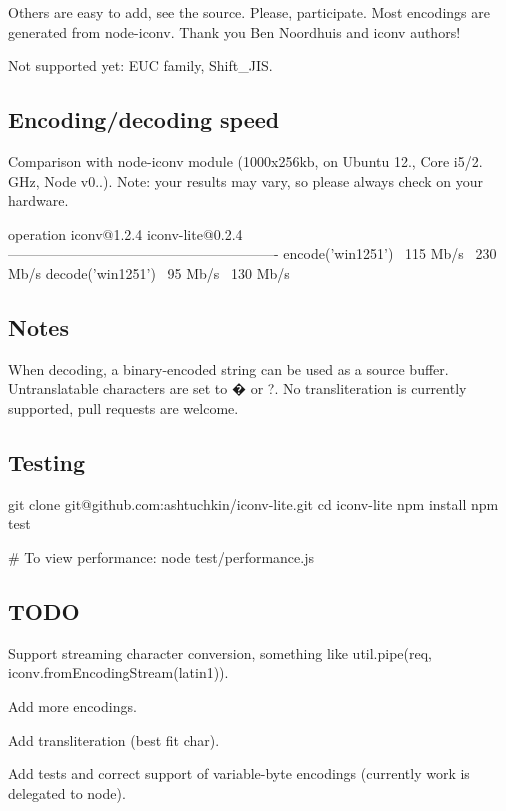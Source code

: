Others are easy to add, see the source. Please, participate. Most encodings are generated from node-\/iconv. Thank you Ben Noordhuis and iconv authors!

Not supported yet\+: E\+UC family, Shift\+\_\+\+J\+IS.

\subsection*{Encoding/decoding speed}

Comparison with node-\/iconv module (1000x256kb, on Ubuntu 12., Core i5/2. G\+Hz, Node v0..). Note\+: your results may vary, so please always check on your hardware. \begin{DoxyVerb}operation             iconv@1.2.4   iconv-lite@0.2.4 
----------------------------------------------------------
encode('win1251')     ~115 Mb/s     ~230 Mb/s
decode('win1251')     ~95 Mb/s      ~130 Mb/s
\end{DoxyVerb}


\subsection*{Notes}

When decoding, a \textquotesingle{}binary\textquotesingle{}-\/encoded string can be used as a source buffer. Untranslatable characters are set to � or ?. No transliteration is currently supported, pull requests are welcome.

\subsection*{Testing}

\begin{DoxyVerb}git clone git@github.com:ashtuchkin/iconv-lite.git
cd iconv-lite
npm install
npm test

# To view performance:
node test/performance.js
\end{DoxyVerb}


\subsection*{T\+O\+DO}


\begin{DoxyItemize}
\item Support streaming character conversion, something like util.\+pipe(req, iconv.\+from\+Encoding\+Stream(\textquotesingle{}latin1\textquotesingle{})).
\item Add more encodings.
\item Add transliteration (best fit char).
\item Add tests and correct support of variable-\/byte encodings (currently work is delegated to node). 
\end{DoxyItemize}